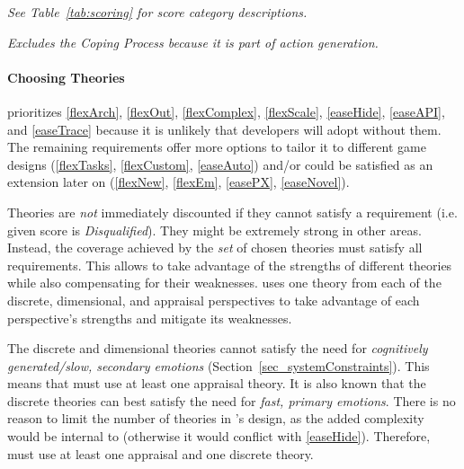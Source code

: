 \begin{table}[!tbh]
\begin{threeparttable}
\begin{tablenotes}
            \footnotesize
            \vspace*{2mm}

            \item \textit{See Table~\ref{tab:scoring} for score category
                descriptions.}

            \item {\small\textpmhg{\Hi}} \textit{Excludes the
                \textit{Coping Process} because it is part of action
                generation.}

        \end{tablenotes}
    \end{threeparttable}%
\end{table}

\paragraph{Choosing Theories} \progname{} prioritizes \ref{flexArch},
\ref{flexOut}, \ref{flexComplex}, \ref{flexScale}, \ref{easeHide},
\ref{easeAPI}, and \ref{easeTrace} because it is unlikely that developers will
adopt \progname{} without them. The remaining requirements offer more options
to tailor it to different game designs (\ref{flexTasks}, \ref{flexCustom},
\ref{easeAuto}) and/or could be satisfied as an extension later on
(\ref{flexNew}, \ref{flexEm}, \ref{easePX}, \ref{easeNovel}).

Theories are \textit{not} immediately discounted if they cannot satisfy a
requirement (i.e. given score is \textit{Disqualified}). They might be
extremely strong in other areas. Instead, the coverage achieved by the
\textit{set} of chosen theories must satisfy all requirements. This allows
\progname{} to take advantage of the strengths of different theories while also
compensating for their weaknesses. \progname{} uses one theory from each of the
discrete, dimensional, and appraisal perspectives to take advantage of each
perspective's strengths and mitigate its weaknesses.

The discrete and dimensional theories cannot satisfy the need for
\textit{cognitively generated/slow, secondary emotions}
(Section~\ref{sec_systemConstraints}). This means that \progname{} must use at
least one appraisal theory. It is also known that the discrete theories can
best satisfy the need for \textit{fast, primary emotions}. There is no reason
to limit the number of theories in \progname{}'s design, as the added
complexity would be internal to \progname{} (otherwise it would conflict with
\ref{easeHide}). Therefore, \progname{} must use at least one appraisal and one
discrete theory.

